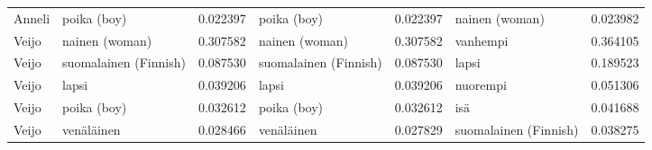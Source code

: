 \begin{longtable}{llrlrlr}
Anneli &               poika (boy) &                         0.022397 &               poika (boy) &                              0.022397 &        nainen (woman) &                        0.023982 \\
 Veijo &            nainen (woman) &                         0.307582 &            nainen (woman) &                              0.307582 &              vanhempi &                        0.364105 \\
 Veijo &     suomalainen (Finnish) &                         0.087530 &     suomalainen (Finnish) &                              0.087530 &                 lapsi &                        0.189523 \\
 Veijo &                     lapsi &                         0.039206 &                     lapsi &                              0.039206 &              nuorempi &                        0.051306 \\
 Veijo &               poika (boy) &                         0.032612 &               poika (boy) &                              0.032612 &                   isä &                        0.041688 \\
 Veijo &                venäläinen &                         0.028466 &                venäläinen &                              0.027829 & suomalainen (Finnish) &                        0.038275 \\
\end{longtable}
